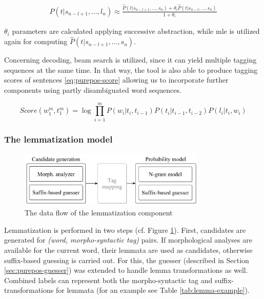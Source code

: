 \begin{align}
 P(t|s_{n-l+1}, \dots, l_n) 
 \approx \frac{ \hat{P}(t|s_{n-l+1}, \dots, s_n) + \theta_i \hat{P}(t|s_{n-l}, \dots, s_n)}{1+\theta_i}
\end{align}

$\theta_i$ parameters are calculated applying successive abstraction, while \gls{mle} is utilized  again for computing $\hat{P}(t|s_{n-l+1}, \dots, s_n)$. 

Concerning decoding, beam search is utilized, since it can yield multiple tagging sequences at the same time. 
In that way, the tool is also able to produce tagging scores of sentences \eqref{eq:purepos-score} allowing us to incorporate further components using partly disambiguated word sequences. 

\begin{equation}\label{eq:purepos-score} %
Score(w_1^m,t_1^m) = \log \prod_{i=1}^m P(w_i|t_i,t_{i-1})P(t_i|t_{i-1},t_{i-2})P(l_i|t_i,w_i)
\end{equation}

\subsubsection{The lemmatization model}

\begin{figure}[H]
  \centering
  \includegraphics[width=0.8\textwidth]{MorphTagging/lemma_arch.png} 
  \caption{The data flow of the lemmatization component}
  \label{fig:lemma-arch}
\end{figure}

Lemmatization is performed in two steps (cf. Figure \ref{fig:lemma-arch}). 
First, candidates are generated for \emph{(word, morpho-syntactic tag)} pairs. 
If morphological analyses are available for the current word, their lemmata are used as candidates, otherwise suffix-based guessing is carried out. 
For this, the guesser (described in Section \ref{sec:purepos-guesser}) was extended to handle lemma transformations as well. 
Combined labels can represent both the morpho-syntactic tag and suffix-transformations for lemmata (for an example see Table \ref{tab:lemma-example}).


